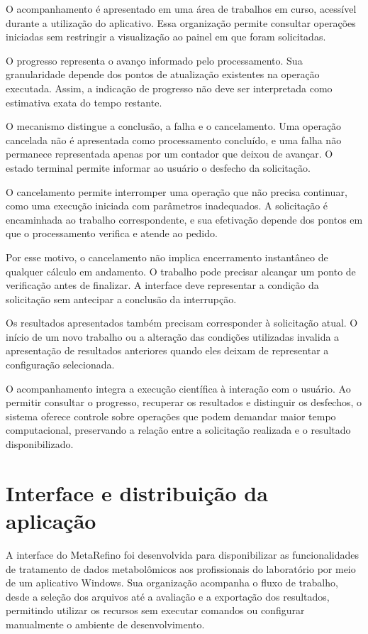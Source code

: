 O acompanhamento é apresentado em uma área de trabalhos em curso, acessível durante a utilização do aplicativo. Essa organização permite consultar operações iniciadas sem restringir a visualização ao painel em que foram solicitadas.

O progresso representa o avanço informado pelo processamento. Sua granularidade depende dos pontos de atualização existentes na operação executada. Assim, a indicação de progresso não deve ser interpretada como estimativa exata do tempo restante.

O mecanismo distingue a conclusão, a falha e o cancelamento. Uma operação cancelada não é apresentada como processamento concluído, e uma falha não permanece representada apenas por um contador que deixou de avançar. O estado terminal permite informar ao usuário o desfecho da solicitação.

O cancelamento permite interromper uma operação que não precisa continuar, como uma execução iniciada com parâmetros inadequados. A solicitação é encaminhada ao trabalho correspondente, e sua efetivação depende dos pontos em que o processamento verifica e atende ao pedido.

Por esse motivo, o cancelamento não implica encerramento instantâneo de qualquer cálculo em andamento. O trabalho pode precisar alcançar um ponto de verificação antes de finalizar. A interface deve representar a condição da solicitação sem antecipar a conclusão da interrupção.

Os resultados apresentados também precisam corresponder à solicitação atual. O início de um novo trabalho ou a alteração das condições utilizadas invalida a apresentação de resultados anteriores quando eles deixam de representar a configuração selecionada.

O acompanhamento integra a execução científica à interação com o usuário. Ao permitir consultar o progresso, recuperar os resultados e distinguir os desfechos, o sistema oferece controle sobre operações que podem demandar maior tempo computacional, preservando a relação entre a solicitação realizada e o resultado disponibilizado.

\section{Interface e distribuição da aplicação}
\label{sec:interface-distribuicao}

A interface do MetaRefino foi desenvolvida para disponibilizar as funcionalidades de tratamento de dados metabolômicos aos profissionais do laboratório por meio de um aplicativo Windows. Sua organização acompanha o fluxo de trabalho, desde a seleção dos arquivos até a avaliação e a exportação dos resultados, permitindo utilizar os recursos sem executar comandos ou configurar manualmente o ambiente de desenvolvimento.

